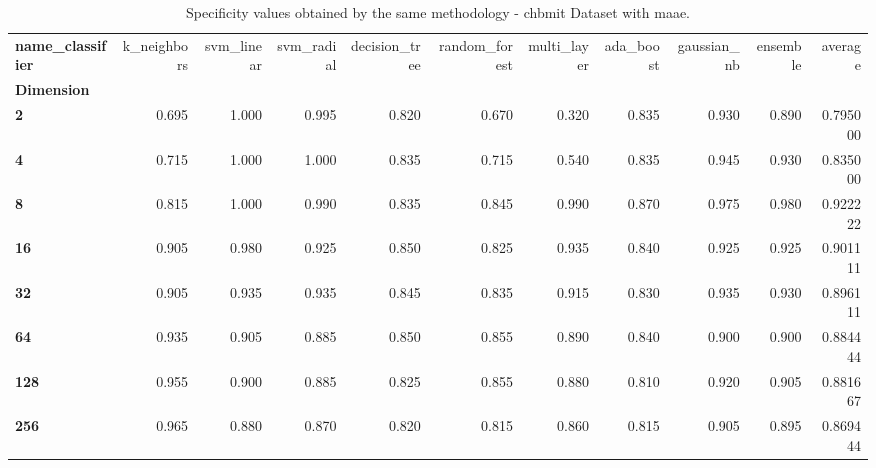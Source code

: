 \begin{table}
\centering
\caption{Specificity values obtained by the same methodology - chbmit Dataset with maae.}
\label{specificity_chbmit_maae-reproduction}
\begin{tabular}{lrrrrrrrrrr}
\toprule
\textbf{name\_classifier} &  k\_neighbors &  svm\_linear &  svm\_radial &  decision\_tree &  random\_forest &  multi\_layer &  ada\_boost &  gaussian\_nb &  ensemble &   average \\
\textbf{Dimension} &              &             &             &                &                &              &            &              &           &           \\
\midrule
\textbf{2        } &        0.695 &       1.000 &       0.995 &          0.820 &          0.670 &        0.320 &      0.835 &        0.930 &     0.890 &  0.795000 \\
\textbf{4        } &        0.715 &       1.000 &       1.000 &          0.835 &          0.715 &        0.540 &      0.835 &        0.945 &     0.930 &  0.835000 \\
\textbf{8        } &        0.815 &       1.000 &       0.990 &          0.835 &          0.845 &        0.990 &      0.870 &        0.975 &     0.980 &  0.922222 \\
\textbf{16       } &        0.905 &       0.980 &       0.925 &          0.850 &          0.825 &        0.935 &      0.840 &        0.925 &     0.925 &  0.901111 \\
\textbf{32       } &        0.905 &       0.935 &       0.935 &          0.845 &          0.835 &        0.915 &      0.830 &        0.935 &     0.930 &  0.896111 \\
\textbf{64       } &        0.935 &       0.905 &       0.885 &          0.850 &          0.855 &        0.890 &      0.840 &        0.900 &     0.900 &  0.884444 \\
\textbf{128      } &        0.955 &       0.900 &       0.885 &          0.825 &          0.855 &        0.880 &      0.810 &        0.920 &     0.905 &  0.881667 \\
\textbf{256      } &        0.965 &       0.880 &       0.870 &          0.820 &          0.815 &        0.860 &      0.815 &        0.905 &     0.895 &  0.869444 \\
\bottomrule
\end{tabular}
\end{table}

